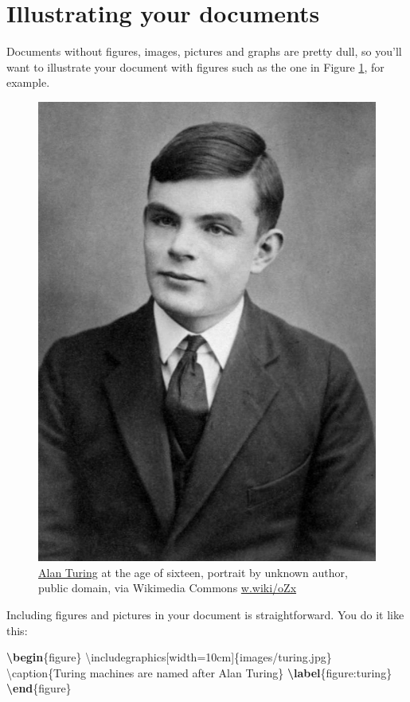 \documentclass[
]{book}
\newenvironment{Shaded}{\begin{snugshade}}{\end{snugshade}}
\newcommand{\BuiltInTok}[1]{#1}
\newcommand{\ExtensionTok}[1]{#1}
\newcommand{\FunctionTok}[1]{\textcolor[rgb]{0.00,0.00,0.00}{#1}}
\newcommand{\KeywordTok}[1]{\textcolor[rgb]{0.13,0.29,0.53}{\textbf{#1}}}
\newcommand{\NormalTok}[1]{#1}
\begin{document}
\hypertarget{illustrating-your-documents}{%
\section{Illustrating your documents}\label{illustrating-your-documents}}

Documents without figures, images, pictures and graphs are pretty dull, so you'll want to illustrate your document with figures such as the one in Figure \ref{fig:turing-fig}, for example.

\begin{figure}

{\centering \includegraphics[width=0.4\linewidth]{images/Alan_Turing_Aged_16} 

}

\caption{\href{https://en.wikipedia.org/wiki/Alan_Turing}{Alan Turing} at the age of sixteen, portrait by unknown author, public domain, via Wikimedia Commons \href{https://w.wiki/oZx}{w.wiki/oZx}}\label{fig:turing-fig}
\end{figure}



Including figures and pictures in your document is straightforward. You do it like this:

\begin{Shaded}
\begin{Highlighting}[]
\KeywordTok{\textbackslash{}begin}\NormalTok{\{}\ExtensionTok{figure}\NormalTok{\}}
\BuiltInTok{\textbackslash{}includegraphics}\NormalTok{[width=10cm]\{}\ExtensionTok{images/turing.jpg}\NormalTok{\}}
\FunctionTok{\textbackslash{}caption}\NormalTok{\{Turing machines are named after Alan Turing\}}
\KeywordTok{\textbackslash{}label}\NormalTok{\{}\ExtensionTok{figure:turing}\NormalTok{\}}
\KeywordTok{\textbackslash{}end}\NormalTok{\{}\ExtensionTok{figure}\NormalTok{\}}
\end{Highlighting}
\end{Shaded}
\end{document}
